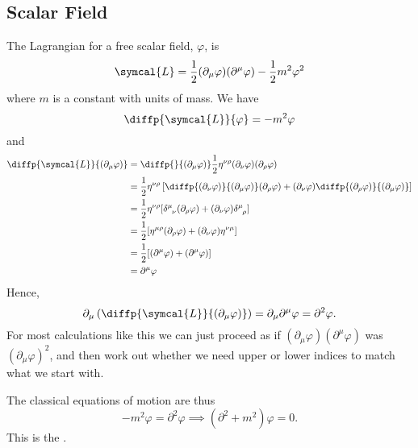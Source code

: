 \documentclass[fleqn]{NotesClass}
\newcommand{\minkowskiMetric}{\eta}
\newcommand{\dalembertian}{\partial^2}
\newcommand{\lagrangianDensity}{\symcal{L}}
\begin{document}
    \subsection{Scalar Field}
    The Lagrangian for a free scalar field, \(\varphi\), is
    \begin{equation}
        \lagrangianDensity = \frac{1}{2}(\partial_\mu \varphi)(\partial^\mu \varphi) - \frac{1}{2}m^2\varphi^2
    \end{equation}
    where \(m\) is a constant with units of mass.
    We have
    \begin{equation}
        \diffp{\lagrangianDensity}{\varphi} = -m^2\varphi
    \end{equation}
    and
    \begin{align}
        \diffp{\lagrangianDensity}{(\partial_\mu \varphi)} &= \diffp{}{(\partial_\mu \varphi)} \frac{1}{2} \minkowskiMetric^{\nu\rho}(\partial_\nu \varphi)(\partial_\rho \varphi)\\
        &= \frac{1}{2}\minkowskiMetric^{\nu\rho} \left[ \diffp{(\partial_\nu \varphi)}{(\partial_\mu \varphi)} (\partial_\rho \varphi) + (\partial_\nu \varphi) \diffp{(\partial_\rho \varphi)}{(\partial_\mu \varphi)} \right]\\
        &= \frac{1}{2}\minkowskiMetric^{\nu\rho} [\tensor{\delta}{^\mu_\nu} (\partial_\rho \varphi) + (\partial_\nu \varphi) \tensor{\delta}{^\mu_\rho}]\\
        &= \frac{1}{2}[\minkowskiMetric^{\mu\rho} (\partial_\rho \varphi) + (\partial_\nu \varphi) \minkowskiMetric^{\nu\mu}]\\
        &= \frac{1}{2}[(\partial^\mu\varphi) + (\partial^\mu\varphi)]\\
        &= \partial^\mu\varphi
    \end{align}
    Hence,
    \begin{equation}
        \partial_\mu\left( \diffp{\lagrangianDensity}{(\partial_\mu \varphi)} \right) = \partial_\mu \partial^\mu \varphi = \dalembertian\varphi.
    \end{equation}
    For most calculations like this we can just proceed as if \((\partial_\mu \varphi)(\partial^\mu \varphi)\) was \((\partial_\mu\varphi)^2\), and then work out whether we need upper or lower indices to match what we start with.
    
    
    The classical equations of motion are thus
    \begin{equation}
        -m^2\varphi = \dalembertian\varphi \implies (\dalembertian + m^2)\varphi = 0.
    \end{equation}
    This is the .
    
\end{document}
